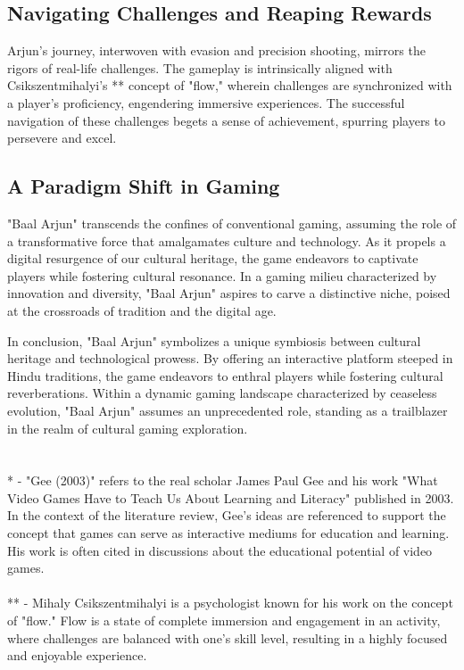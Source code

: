 \subsection{Navigating Challenges and Reaping Rewards}
Arjun's journey, interwoven with evasion and precision shooting, mirrors the rigors of real-life challenges. The gameplay is intrinsically aligned with Csikszentmihalyi's ** concept of "flow," wherein challenges are synchronized with a player's proficiency, engendering immersive experiences. The successful navigation of these challenges begets a sense of achievement, spurring players to persevere and excel.

\subsection{A Paradigm Shift in Gaming}
"Baal Arjun" transcends the confines of conventional gaming, assuming the role of a transformative force that amalgamates culture and technology. As it propels a digital resurgence of our cultural heritage, the game endeavors to captivate players while fostering cultural resonance. In a gaming milieu characterized by innovation and diversity, "Baal Arjun" aspires to carve a distinctive niche, poised at the crossroads of tradition and the digital age.

 

In conclusion, "Baal Arjun" symbolizes a unique symbiosis between cultural heritage and technological prowess. By offering an interactive platform steeped in Hindu traditions, the game endeavors to enthral players while fostering cultural reverberations. Within a dynamic gaming landscape characterized by ceaseless evolution, "Baal Arjun" assumes an unprecedented role, standing as a trailblazer in the realm of cultural gaming exploration.
\\\\\\
* - "Gee (2003)" refers to the real scholar James Paul Gee and his work "What Video Games Have to Teach Us About Learning and Literacy" published in 2003. In the context of the literature review, Gee's ideas are referenced to support the concept that games can serve as interactive mediums for education and learning. His work is often cited in discussions about the educational potential of video games.
\\\\
** - Mihaly Csikszentmihalyi is a psychologist known for his work on the concept of "flow." Flow is a state of complete immersion and engagement in an activity, where challenges are balanced with one's skill level, resulting in a highly focused and enjoyable experience.

\newpage